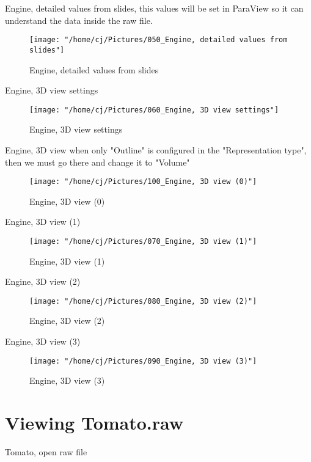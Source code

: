 \documentclass{article}
\begin{document}
\break
Engine, detailed values from slides, this values will be set in ParaView so it can understand the data inside the raw file.

\begin{figure}[H]
  \centering
  \texttt{[image: "/home/cj/Pictures/050\_Engine, detailed values from slides"]}
  \caption{Engine, detailed values from slides}
  \label{}
\end{figure}

\break
Engine, 3D view settings

\begin{figure}[H]
  \centering
  \texttt{[image: "/home/cj/Pictures/060\_Engine, 3D view settings"]}
  \caption{Engine, 3D view settings}
  \label{}
\end{figure}

\break
Engine, 3D view when only "Outline" is configured in the "Representation type", then we must go there and change it to "Volume"

\begin{figure}[H]
  \centering
  \texttt{[image: "/home/cj/Pictures/100\_Engine, 3D view (0)"]}
  \caption{Engine, 3D view (0)}
  \label{}
\end{figure}

Engine, 3D view (1)

\begin{figure}[H]
  \centering
  \texttt{[image: "/home/cj/Pictures/070\_Engine, 3D view (1)"]}
  \caption{Engine, 3D view (1)}
  \label{}
\end{figure}

\break
Engine, 3D view (2)

\begin{figure}[H]
  \centering
  \texttt{[image: "/home/cj/Pictures/080\_Engine, 3D view (2)"]}
  \caption{Engine, 3D view (2)}
  \label{}
\end{figure}


Engine, 3D view (3)

\begin{figure}[H]
  \centering
  \texttt{[image: "/home/cj/Pictures/090\_Engine, 3D view (3)"]}
  \caption{Engine, 3D view (3)}
  \label{}
\end{figure}

\newpage
\section{Viewing Tomato.raw}
Tomato, open raw file
\end{document}
